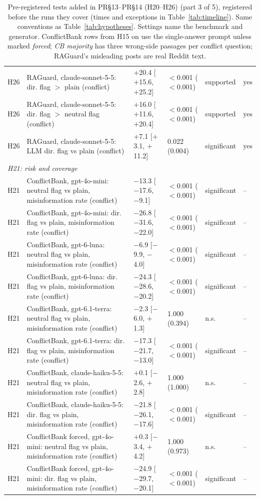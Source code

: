 \begin{table}[p]
{\begin{tabular}{lp{6.6cm}llll}
H26 & RAGuard, claude-sonnet-5-5: dir. flag $>$ plain (conflict) & $+$20.4 [$+$15.6, $+$25.2] & $<$0.001 ($<$0.001) & supported & yes \\
H26 & RAGuard, claude-sonnet-5-5: dir. flag $>$ neutral flag (conflict) & $+$16.0 [$+$11.6, $+$20.4] & $<$0.001 ($<$0.001) & supported & yes \\
H26 & RAGuard, claude-sonnet-5-5: LLM dir. flag vs plain (conflict) & $+$7.1 [$+$3.1, $+$11.2] & 0.022 (0.004) & significant & yes \\
\multicolumn{6}{l}{\emph{H21: risk and coverage}} \\
H21 & ConflictBank, gpt-4o-mini: neutral flag vs plain, misinformation rate (conflict) & $-$13.3 [$-$17.6, $-$9.1] & $<$0.001 ($<$0.001) & significant & -- \\
H21 & ConflictBank, gpt-4o-mini: dir. flag vs plain, misinformation rate (conflict) & $-$26.8 [$-$31.6, $-$22.0] & $<$0.001 ($<$0.001) & significant & -- \\
H21 & ConflictBank, gpt-6-luna: neutral flag vs plain, misinformation rate (conflict) & $-$6.9 [$-$9.9, $-$4.0] & $<$0.001 ($<$0.001) & significant & -- \\
H21 & ConflictBank, gpt-6-luna: dir. flag vs plain, misinformation rate (conflict) & $-$24.3 [$-$28.6, $-$20.2] & $<$0.001 ($<$0.001) & significant & -- \\
H21 & ConflictBank, gpt-6.1-terra: neutral flag vs plain, misinformation rate (conflict) & $-$2.3 [$-$6.0, $+$1.3] & 1.000 (0.394) & n.s. & -- \\
H21 & ConflictBank, gpt-6.1-terra: dir. flag vs plain, misinformation rate (conflict) & $-$17.3 [$-$21.7, $-$13.0] & $<$0.001 ($<$0.001) & significant & -- \\
H21 & ConflictBank, claude-haiku-5-5: neutral flag vs plain, misinformation rate (conflict) & $+$0.1 [$-$2.6, $+$2.8] & 1.000 (1.000) & n.s. & -- \\
H21 & ConflictBank, claude-haiku-5-5: dir. flag vs plain, misinformation rate (conflict) & $-$21.8 [$-$26.1, $-$17.6] & $<$0.001 ($<$0.001) & significant & -- \\
H21 & ConflictBank forced, gpt-4o-mini: neutral flag vs plain, misinformation rate (conflict) & $+$0.3 [$-$3.4, $+$4.2] & 1.000 (0.973) & n.s. & -- \\
H21 & ConflictBank forced, gpt-4o-mini: dir. flag vs plain, misinformation rate (conflict) & $-$24.9 [$-$29.7, $-$20.1] & $<$0.001 ($<$0.001) & significant & -- \\
\bottomrule
\end{tabular}}
\caption{Pre-registered tests added in PR\S13--PR\S14 (H20--H26) (part 3 of 5), registered before the runs they cover (times and exceptions in
Table~\ref{tab:timeline}). Same conventions as
Table~\ref{tab:hypotheses}. Settings name the benchmark and generator. ConflictBank rows from H15 on use the
single-answer prompt unless marked \emph{forced}; \emph{CB majority} has three wrong-side passages per conflict
question; RAGuard's misleading posts are real Reddit text.}
\label{tab:hypotheses8}
\end{table}

